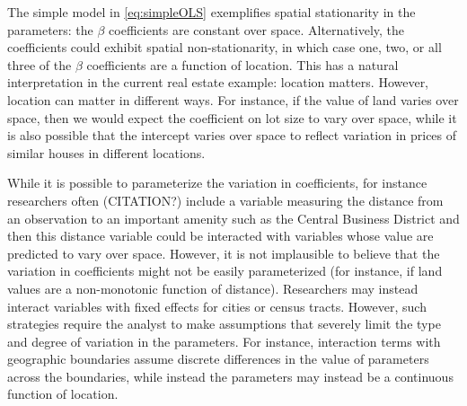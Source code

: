 \documentclass{article}\usepackage[]{graphicx}\usepackage[]{color}
\begin{document}
The simple model in \eqref{eq:simpleOLS} exemplifies spatial stationarity in the parameters: the $\beta$ coefficients are constant over space. Alternatively, the coefficients could exhibit spatial non-stationarity, in which case one, two, or all three of the $\beta$ coefficients are a function of location. This has a natural interpretation in the current real estate example: location matters. However, location can matter in different ways. For instance, if the value of land varies over space, then we would expect the coefficient on lot size to vary over space, while it is also possible that the intercept varies over space to reflect variation in prices of similar houses in different locations. 

While it is possible to parameterize the variation in coefficients, for instance researchers often (CITATION?) include a variable measuring the distance from an observation to an important amenity such as the Central Business District and then this distance variable could be interacted with variables whose value are predicted to vary over space. However, it is not implausible to believe that the variation in coefficients might not be easily parameterized (for instance, if land values are a non-monotonic function of distance). Researchers may instead interact variables with fixed effects for cities or census tracts. However, such strategies require the analyst to make assumptions that severely limit the type and degree of variation in the parameters. For instance, interaction terms with geographic boundaries assume discrete differences in the value of parameters across the boundaries, while instead the parameters may instead be a continuous function of location.
\end{document}
